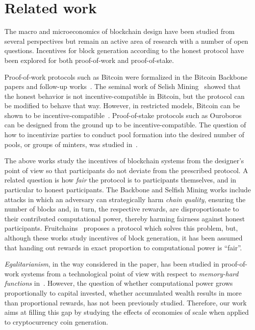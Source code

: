 \section{Related work}\label{sec:related}
The macro and microeconomics of blockchain design have been studied from
several perspectives but remain an active area of research with a number of open questions.
Incentives for block generation
according to the honest protocol have been explored for both proof-of-work and
proof-of-stake.

Proof-of-work protocols such as Bitcoin were formalized in the Bitcoin
Backbone~\cite{EC:GarKiaLeo15,C:GarKiaLeo17} papers and follow-up
works~\cite{pass2017analysis}. The seminal work of Selish
Mining~\cite{FC:EyaSir14,FC:SapSomZoh16} showed that the honest behavior is not
incentive-compatible in Bitcoin, but the protocol can be modified to behave
that way. However, in restricted models, Bitcoin can be shown to be incentive-compatible~\cite{kiayias2016blockchain}.  Proof-of-stake protocols such as
Ouroboros~\cite{C:KRDO17} can be designed from the ground up to be
incentive-compatible. The question of how to incentivize parties to conduct
pool formation into the desired number of pools, or groups of minters, was
studied in~\cite{bkks2018}.

The above works study the incentives of blockchain systems from the designer's
point of view so that participants do not deviate from the prescribed protocol.
A related question is how \emph{fair} the protocol is to participants
themselves, and in particular to honest participants. The Backbone and Selfish
Mining works include attacks in which an adversary can strategically harm
\emph{chain quality}, ensuring the number of blocks and, in turn, the respective
rewards, are disproportionate to their contributed computational power, thereby
harming fairness against honest participants. Fruitchains~\cite{PODC:PasShi17}
proposes a protocol which solves this problem, but, although
these works study incentives of block generation, it has been
assumed that handing out rewards in exact proportion to computational power is
``fair''.

\emph{Egalitarianism}, in the way considered in the paper, has been studied in
proof-of-work systems from a technological point of view with respect to
\emph{memory-hard functions} in~\cite{alwen2017depth,biryukov2016egalitarian}.  However, the question
of whether computational power grows proportionally to capital invested, \ie
whether accumulated wealth results in more than proportional rewards, has not
been previously studied. Therefore, our work aims at filling this gap by
studying the effects of economies of scale when applied to cryptocurrency coin
generation.

